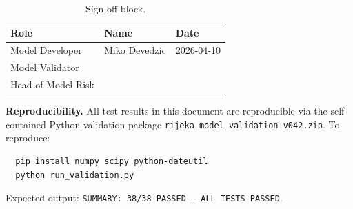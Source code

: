 \documentclass[11pt,a4paper]{article}
\newcommand{\code}[1]{\texttt{\small #1}}
\begin{document}
\begin{table}[H]
\centering
\begin{tabular}{p{5cm}p{5cm}p{4cm}}
\toprule
\textbf{Role} & \textbf{Name} & \textbf{Date} \\
\midrule
Model Developer    & Miko Devedzic & 2026-04-10 \\[2em]
Model Validator    & \underline{\hspace{4cm}} & \underline{\hspace{3cm}} \\[2em]
Head of Model Risk & \underline{\hspace{4cm}} & \underline{\hspace{3cm}} \\
\bottomrule
\end{tabular}
\caption{Sign-off block.}
\end{table}

\vspace{2em}

\noindent\textbf{Reproducibility.} All test results in this document are reproducible
via the self-contained Python validation package \code{rijeka\_model\_validation\_v042.zip}.
To reproduce:
\begin{verbatim}
  pip install numpy scipy python-dateutil
  python run_validation.py
\end{verbatim}
Expected output: \texttt{SUMMARY: 38/38 PASSED --- ALL TESTS PASSED}.

\vfill
{}
\end{document}
